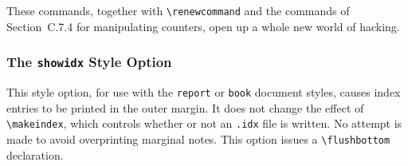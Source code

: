 These commands, together with \hbox{\verb|\renewcommand|} and the
commands of Section~C.7.4 for manipulating counters, open up a whole
new world of hacking.

%
%
%

\subsubsection{The {\tt showidx} Style Option}

This style option, for use with the {\tt report} or {\tt book} document
styles, causes index entries to be printed in the outer margin.  It
does not change the effect of \verb|\makeindex|, which controls
whether or not an {\tt .idx} file is written.  No attempt is made to
avoid overprinting marginal notes.  This option issues a
\verb|\flushbottom| declaration.

